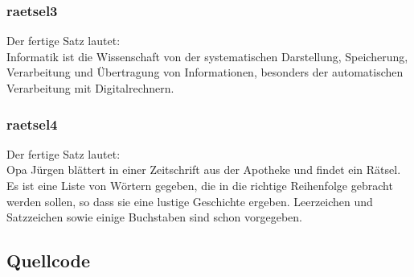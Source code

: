 \documentclass[a4paper, 12pt]{scrartcl}
\begin{document}
\subsubsection{raetsel3}
Der fertige Satz lautet:\\
Informatik ist die Wissenschaft von der systematischen Darstellung, Speicherung, Verarbeitung und Übertragung von Informationen, besonders der automatischen Verarbeitung mit Digitalrechnern.

\subsubsection{raetsel4}
Der fertige Satz lautet:\\
Opa Jürgen blättert in einer Zeitschrift aus der Apotheke und findet ein Rätsel. Es ist eine Liste von Wörtern gegeben, die in die richtige Reihenfolge gebracht werden sollen, so dass sie eine lustige Geschichte ergeben. Leerzeichen und Satzzeichen sowie einige Buchstaben sind schon vorgegeben.

\subsection{Quellcode}
\end{document}
